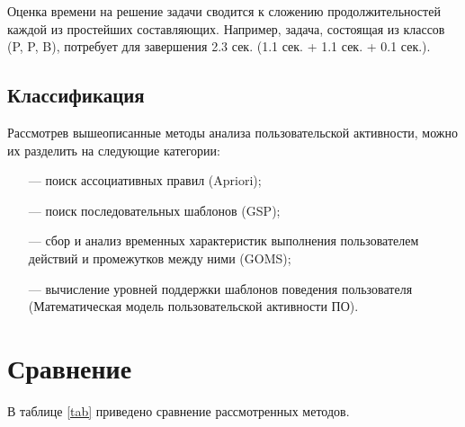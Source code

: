 Оценка времени на решение задачи сводится к сложению продолжительностей каждой из простейших составляющих. Например, задача, состоящая из классов (P, P, B), потребует для завершения 2.3 сек. (1.1 сек. + 1.1 сек. + 0.1 сек.).

\subsection{Классификация}
Рассмотрев вышеописанные методы анализа пользовательской активности, можно их разделить на следующие категории:
\begin{itemize}
	\item[---] поиск ассоциативных правил (Apriori);
	\item[---] поиск последовательных шаблонов (GSP);
	\item[---] сбор и анализ временных характеристик выполнения пользователем действий и промежутков между ними (GOMS);
	\item[---] вычисление уровней поддержки шаблонов поведения пользователя (Математическая модель пользовательской активности ПО).
\end{itemize}



\section{Сравнение}

В таблице \ref{tab} приведено сравнение рассмотренных методов.


